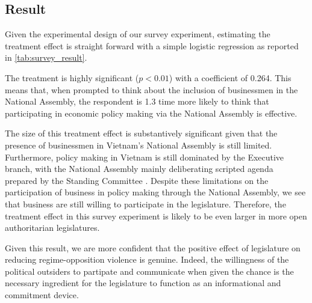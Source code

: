 \subsection{Result}

Given the experimental design of our survey experiment, estimating the treatment effect is straight forward with a simple logistic regression as reported in \autoref*{tab:survey_result}.

The treatment is highly significant ($p < 0.01$) with a coefficient of 0.264. This means that, when prompted to think about the inclusion of businessmen in the National Assembly, the respondent is 1.3 time more likely to think that participating in economic policy making via the National Assembly is effective.

The size of this treatment effect is substantively significant given that the presence of businessmen in Vietnam's National Assembly is still limited. Furthermore, policy making in Vietnam is still dominated by the Executive branch, with the National Assembly mainly deliberating scripted agenda prepared by the Standing Committee \citep{Montesano2005}. Despite these limitations on the participation of business in policy making through the National Assembly, we see that business are still willing to participate in the legislature. Therefore, the treatment effect in this survey experiment is likely to be even larger in more open authoritarian legislatures.

Given this result, we are more confident that the positive effect of legislature on reducing regime-opposition violence is genuine. Indeed, the willingness of the political outsiders to partipate and communicate when given the chance is the necessary ingredient for the legislature to function as an informational and commitment device.

